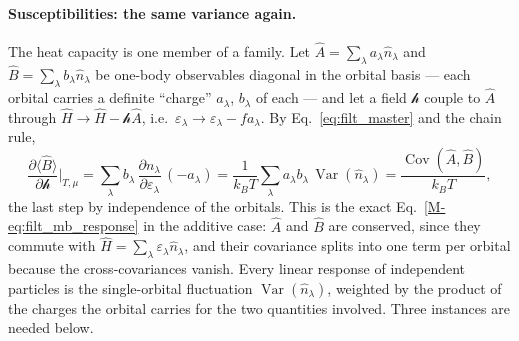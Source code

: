 \documentclass[10pt,a4paper]{article}
\theoremstyle{plain}
\theoremstyle{remark}
\newcommand{\Var}{\operatorname{Var}}
\newcommand{\Cov}{\operatorname{Cov}}
\newcommand{\hfield}{\mathscr{h}}  %
\begin{document}
\paragraph{Susceptibilities: the same variance again.} The heat capacity is one
member of a family. Let $ \hat A = \sum_\lambda a_\lambda\hat n_\lambda $ and
$ \hat B = \sum_\lambda b_\lambda\hat n_\lambda $ be one-body observables diagonal in
the orbital basis --- each orbital carries a definite ``charge'' $ a_\lambda $,
$ b_\lambda $ of each --- and let a field $ \hfield $ couple to $ \hat A $ through
$ \hat H \to \hat H - \hfield\hat A $, i.e.\ $ \varepsilon_\lambda \to \varepsilon_\lambda -
fa_\lambda $. By Eq.~\eqref{eq:filt_master} and the chain rule,
\begin{equation}\label{eq:filt_response}
  \frac{\partial\langle\hat B\rangle}{\partial \hfield}\bigg|_{T,\mu}
  = \sum_\lambda b_\lambda\,\frac{\partial n_\lambda}{\partial\varepsilon_\lambda}\,(-a_\lambda)
  = \frac{1}{k_BT}\sum_\lambda a_\lambda b_\lambda\,\Var(\hat n_\lambda)
  = \frac{\Cov(\hat A, \hat B)}{k_BT} ,
\end{equation}
the last step by independence of the orbitals. This is the exact
Eq.~\eqref{M-eq:filt_mb_response} in the additive case: $ \hat A $ and $ \hat B $ are
conserved, since they commute with $ \hat H = \sum_\lambda\varepsilon_\lambda\hat n_\lambda $,
and their covariance splits into one term per orbital because the cross-covariances
vanish. Every linear response of
independent particles is the single-orbital fluctuation $ \Var(\hat n_\lambda) $,
weighted by the product of the charges the orbital carries for the two quantities
involved. Three instances are needed below.
\end{document}
